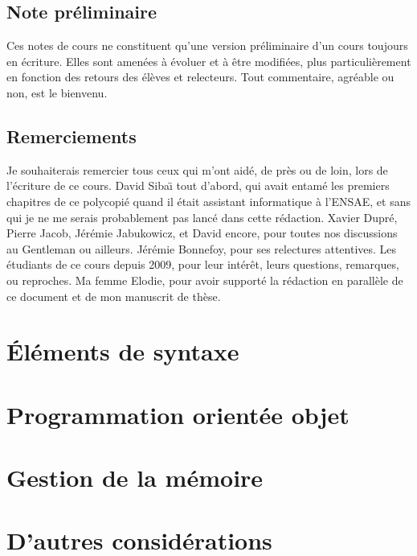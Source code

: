 \documentclass[a4paper]{book}
\begin{document}


\chapter{Note pr\'eliminaire}
Ces notes de cours ne constituent qu'une version pr\'eliminaire d'un cours toujours en \'ecriture. Elles sont amen\'ees \`a \'evoluer et \`a \^etre modifi\'ees,
plus particuli\`erement en fonction des retours des \'el\`eves et relecteurs. Tout commentaire, agr\'eable ou non, est le bienvenu.


\chapter*{Remerciements}
Je souhaiterais remercier tous ceux qui m'ont aid\'e, de pr\`es ou de loin, lors de l'\'ecriture de ce cours. David Siba\"{\i} tout d'abord, qui avait entam\'e les premiers chapitres de ce polycopi\'e quand il \'etait assistant informatique \`{a} l'ENSAE, et sans qui je ne me serais probablement pas lanc\'e dans cette r\'edaction. Xavier Dupr\'e, Pierre Jacob, J\'er\'emie Jabukowicz, et David encore, pour toutes nos discussions au Gentleman ou ailleurs. J\'er\'emie Bonnefoy, pour ses relectures attentives. Les \'etudiants de ce cours depuis 2009, pour leur int\'er\^{e}t, leurs questions, remarques, ou reproches. Ma femme Elodie, pour avoir support\'e la r\'edaction en parall\`{e}le de ce document et de mon manuscrit de th\`{e}se.

\begin{quote}

\end{quote}

\tableofcontents



\part{\'El\'ements de syntaxe}





%
\part{Programmation orient\'ee objet}





\part{Gestion de la m\'emoire}


\part{D'autres consid\'erations}



\nocite{*}


\end{document}
